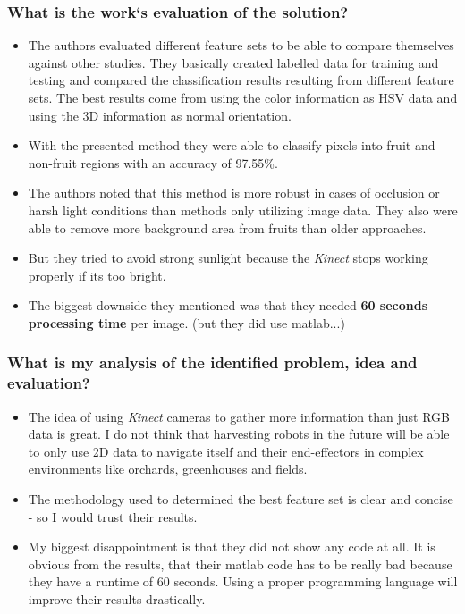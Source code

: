 \documentclass{article}
\begin{document}
\subsubsection*{What is the work`s evaluation of the solution?}
\begin{itemize}
    \item The authors evaluated different feature sets to be able to compare themselves against other studies. They basically created labelled data for training and testing and compared the classification results resulting from different feature sets. The best results come from using the color information as HSV data and using the 3D information as normal orientation. 
    \item With the presented method they were able to classify pixels into fruit and non-fruit regions with an accuracy of 97.55\%. 
    \item The authors noted that this method is more robust in cases of occlusion or harsh light conditions than methods only utilizing image data. They also were able to remove more background area from fruits than older approaches.
    \item But they tried to avoid strong sunlight because the \emph{Kinect} stops working properly if its too bright.
    \item The biggest downside they mentioned was that they needed \textbf{60 seconds processing time} per image. (but they did use matlab...)
\end{itemize}
\subsubsection*{What is my analysis of the identified problem, idea and evaluation?}
\begin{itemize}
    \item The idea of using \emph{Kinect} cameras to gather more information than just RGB data is great. I do not think that harvesting robots in the future will be able to only use 2D data to navigate itself and their end-effectors in complex environments like orchards, greenhouses and fields.
    \item The methodology used to determined the best feature set is clear and concise - so I would trust their results.
    \item My biggest disappointment is that they did not show any code at all. It is obvious from the results, that their matlab code has to be really bad because they have a runtime of 60 seconds. Using a proper programming language will improve their results drastically.
\end{itemize}
\end{document}
